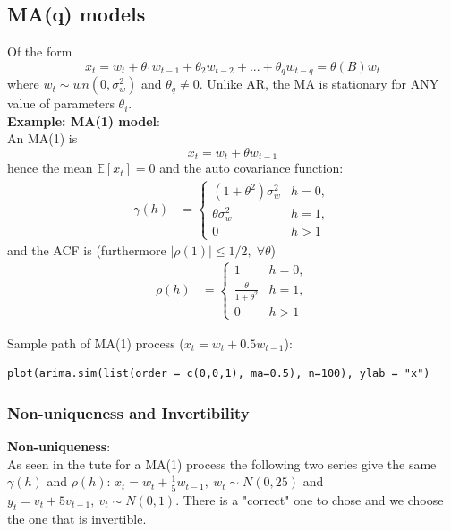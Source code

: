 \documentclass[11pt]{article}
\newcommand{\noi}{\noindent}
\begin{document}
\subsection{MA(q) models}
\noi Of the form
$$x_t = w_t + \theta_1w_{t-1} + \theta_2w_{t-2} + ... + \theta_qw_{t-q} = \theta(B)w_t$$
\noi where $w_t \sim wn(0, \sigma_w^2)$ and $\theta_q \neq 0$. Unlike AR, the MA is stationary for ANY value of parameters $\theta_i$. \\

\noi \textbf{Example: MA(1) model}: \\
\noi An MA(1) is
$$x_t = w_t + \theta w_{t-1}$$
\noi hence the mean $\mathbb{E}[x_t] = 0$ and the auto covariance function:
\begin{align*}
    \gamma(h) &= \begin{cases}
        (1+\theta^2)\sigma_w^2 & h = 0, \\
        \theta\sigma_w^2 & h=1, \\
        0 & h > 1
    \end{cases}
\end{align*} \phantom{i}
\noi and the ACF is (furthermore $|\rho(1)| \leq 1/2, \; \forall \theta$)
\begin{align*}
    \rho(h) &= \begin{cases}
        1 & h = 0, \\
        \frac{\theta}{1+\theta^2} & h=1, \\
        0 & h >1
    \end{cases}
\end{align*} \phantom{i}

\noi Sample path of MA(1) process ($x_t = w_t + 0.5w_{t-1}$):
\begin{lstlisting}
plot(arima.sim(list(order = c(0,0,1), ma=0.5), n=100), ylab = "x")
\end{lstlisting}

\subsubsection{Non-uniqueness and Invertibility}
\noi \textbf{Non-uniqueness}: \\
\noi As seen in the tute for a MA(1) process the following two series give the same $\gamma(h)$ and $\rho(h)$: $x_t = w_t + \frac{1}{5}w_{t-1}, \ w_t\sim N(0, 25)$ and $y_t = v_t + 5v_{t-1}, \ v_t \sim N(0,1)$. There is a "correct" one to chose and we choose the one that is invertible. \\
\end{document}
